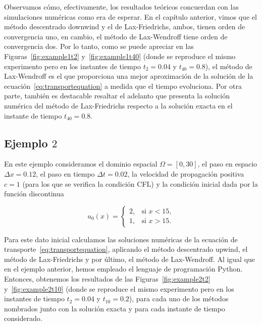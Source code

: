 Observamos cómo, efectivamente, los resultados teóricos concuerdan
con las simulaciones numéricas como era de esperar.
En el capítulo anterior, vimos que el método descentrado downwind y
el de Lax-Friedrichs, ambos, tienen orden de convergencia uno, en
cambio, el método de Lax-Wendroff tiene orden de convergencia dos.
Por lo tanto, como se puede apreciar en las
Figuras~\ref{fig:example1t2} y~\ref{fig:example1t40} (donde se
reproduce el mismo experimento pero en los instantes de tiempo
$t_{2}=0.04$ y $t_{40}=0.8$), el método de Lax-Wendroff es el que
proporciona una mejor aproximación de la solución de la
ecuación~\eqref{eq:transportequation} a medida que el tiempo
evoluciona.
Por otra parte, también es destacable resaltar el adelanto que
presenta la solución numérica del método de Lax-Friedrichs respecto a
la solución exacta en el instante de tiempo $t_{40}=0.8$.

\subsection*{Ejemplo $2$}

En este ejemplo consideramos el dominio espacial
$\Omega=\left[0,30\right]$, el paso en espacio $\Delta x=0.12$, el
paso en tiempo $\Delta t=0.02$, la velocidad de propagación positiva
$c=1$ (para los que se verifica la condición CFL) y la condición
inicial dada por la función discontinua

\begin{equation*}
    u_{0}\left(x\right)=
    \begin{cases}
        2, & \text{si }x<15, \\
        1, & \text{si }x>15.
    \end{cases}
\end{equation*}

Para este dato inicial calculamos las soluciones numéricas de la
ecuación de transporte~\eqref{eq:transportequation}, aplicando el
método descentrado upwind, el método de Lax-Friedrichs y por último,
el método de Lax-Wendroff.
Al igual que en el ejemplo anterior, hemos empleado el lenguaje de
programación Python.
Entonces, obtenemos los resultados de las
Figuras~\ref{fig:example2t2} y~\ref{fig:example2t10} (donde se
reproduce el mismo experimento pero en los instantes de tiempo
$t_{2}=0.04$ y $t_{10}=0.2$), para cada uno de los métodos nombrados
junto con la solución exacta y para cada instante de tiempo
considerado.

